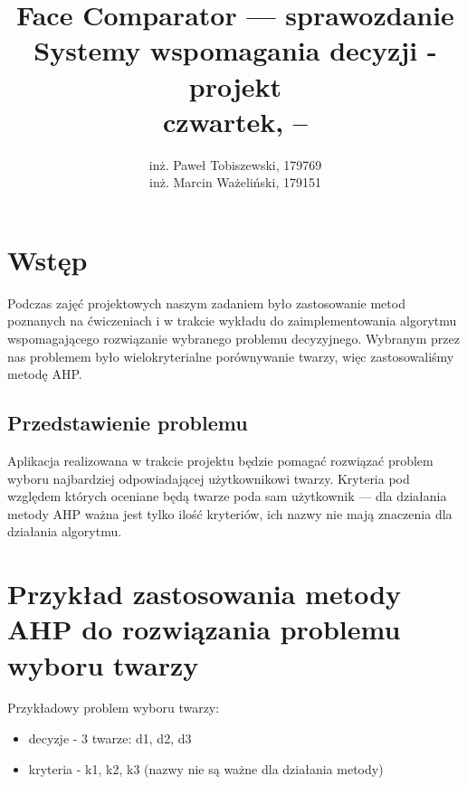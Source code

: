 \documentclass[a4paper,notitlepage]{article}
\author{
	inż. Paweł Tobiszewski, 179769\\
	inż. Marcin Ważeliński, 179151
}
\title{
	Face Comparator --- sprawozdanie\\
	Systemy wspomagania decyzji - projekt\\
	czwartek, \hour{18}{55} -- \hour{20}{30}
}
\date{}
\begin{document}
\maketitle

\section{Wstęp}
Podczas zajęć projektowych naszym zadaniem było zastosowanie metod poznanych na ćwiczeniach i w trakcie wykładu do zaimplementowania algorytmu wspomagającego rozwiązanie wybranego problemu decyzyjnego.
Wybranym przez nas problemem było wielokryterialne porównywanie twarzy, więc zastosowaliśmy metodę AHP.

\subsection{Przedstawienie problemu}
Aplikacja realizowana w trakcie projektu będzie pomagać rozwiązać problem wyboru najbardziej odpowiadającej użytkownikowi twarzy.
Kryteria pod względem których oceniane będą twarze poda sam użytkownik --- dla działania metody AHP ważna jest tylko ilość kryteriów, ich nazwy nie mają znaczenia dla działania algorytmu.

\section{Przykład zastosowania metody AHP do rozwiązania problemu wyboru twarzy}

Przykładowy problem wyboru twarzy:
\begin{itemize}
\item decyzje - 3 twarze: d1, d2, d3
\item kryteria - k1, k2, k3 (nazwy nie są ważne dla działania metody)
\end{itemize}
\end{document}
